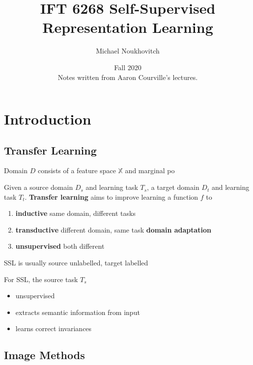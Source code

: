 \documentclass[]{article}
\theoremstyle{definition}
\begin{document}
    \let\ref\Cref

    \title{\bf{IFT 6268 Self-Supervised Representation Learning}}
    \date{Fall 2020 \\ \center Notes written from Aaron Courville's lectures.}
    \author{Michael Noukhovitch}

    \maketitle
    \newpage
    \tableofcontents
    \newpage



    \section{Introduction}

    \subsection{Transfer Learning}%
    \label{sub:transfer_learning}

    Domain $D$ consists of a feature space $\mathbb{X}$ and marginal po

    Given a source domain $D_s$ and learning task $T_s$, a target domain $D_t$ and learning task $T_t$. \textbf{Transfer learning} aims to improve learning a function $f$ to
    \begin{enumerate}
        \item \textbf{inductive} same domain, different tasks
        \item \textbf{transductive} different domain, same task \textbf{domain adaptation}
        \item \textbf{unsupervised} both different
    \end{enumerate}

    SSL is usually source unlabelled, target labelled

    For SSL, the source task $T_s$
    \begin{itemize}
        \item unsupervised
        \item extracts semantic information from input
        \item learns correct invariances
    \end{itemize}

    \subsection{Image Methods}%
    \label{sub:questions}
\end{document}

